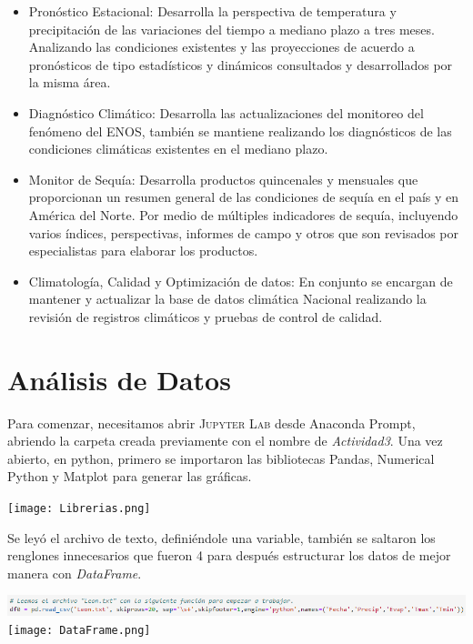 \documentclass{article}
\begin{document}
\begin{itemize}
    \item Pronóstico Estacional: Desarrolla la perspectiva de temperatura y precipitación de las variaciones del tiempo a mediano plazo a tres meses. Analizando las condiciones existentes y las proyecciones de acuerdo a pronósticos de tipo estadísticos y dinámicos consultados y desarrollados por la misma área.
    
    \item Diagnóstico Climático: Desarrolla las actualizaciones del monitoreo del fenómeno del ENOS, también se mantiene realizando los diagnósticos de las condiciones climáticas existentes en el mediano plazo.
    
    \item Monitor de Sequía: Desarrolla productos quincenales y mensuales que proporcionan un resumen general de las condiciones de sequía en el país y en América del Norte. Por medio de múltiples indicadores de sequía, incluyendo varios índices, perspectivas, informes de campo y otros que son revisados por especialistas para elaborar los productos.
    
    \item Climatología, Calidad y Optimización de datos: En conjunto se encargan de mantener y actualizar la base de datos climática Nacional realizando la revisión de registros climáticos y pruebas de control de calidad.
\end{itemize}

\section{Análisis de Datos}

Para comenzar, necesitamos abrir \textsc{Jupyter Lab} desde Anaconda Prompt, abriendo la carpeta creada previamente con el nombre de \textit{Actividad3}.
Una vez abierto, en python, primero se importaron las bibliotecas Pandas, Numerical Python y Matplot para generar las gráficas.

\begin{center}
    \texttt{[image: Librerias.png]}
\end{center}

\noindent Se leyó el archivo de texto, definiéndole una variable, también se saltaron los renglones innecesarios que fueron 4 para después estructurar los datos de mejor manera con \textit{DataFrame}.

\begin{center}
    \includegraphics[scale = .65]{read.png}
    \texttt{[image: DataFrame.png]}
\end{center}
\end{document}
